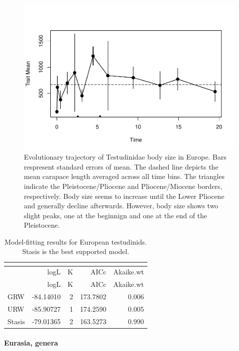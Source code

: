 \begin{figure}[H]
	\centering
	\includegraphics{MA_JJ_files/figure-latex/paleoTSEurope-1.pdf}
	\caption[PaleoTS plot of European \T]{Evolutionary trajectory of Testudinidae body size in Europe. Bars respresent standard errors of mean. The dashed line depicts the mean carapace length averaged across all time bins. The triangles indicate the Pleistocene/Pliocene and Pliocene/Miocene borders, respectively. Body size seems to increase until the Lower Pliocene and generally decline afterwards. However, body size shows two slight peaks, one at the beginnign and one at the end of the Pleistocene.}
	\label{fig:pTSEu}
\end{figure}

\begin{longtable}[]{@{}lrrrr@{}}
	\caption[Model fits for European \T]{Model-fitting results for European testudinids. Stasis is the best supported model.}
	\label{tab:pTSEuEM}\tabularnewline
	\toprule
	& logL & K & AICc & Akaike.wt\tabularnewline
	\midrule
	\endfirsthead
	\toprule
	& logL & K & AICc & Akaike.wt\tabularnewline
	\midrule
	\endhead
	GRW & -84.14010 & 2 & 173.7802 & 0.006\tabularnewline
	URW & -85.90727 & 1 & 174.2590 & 0.005\tabularnewline
	Stasis & -79.01365 & 2 & 163.5273 & 0.990\tabularnewline
	\bottomrule
\end{longtable}

\FloatBarrier



\paragraph{Eurasia,	genera}\label{eurasia-genera}


